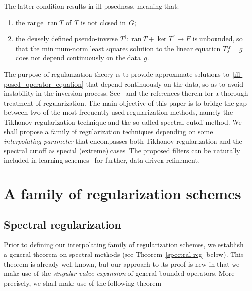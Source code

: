\documentclass[a4paper]{article}
\def\ran#1{\mathop{\mathrm{ran}}#1}
\def\ker#1{\mathop{\mathrm{ker}}#1}
\begin{document}
The latter condition results in ill-posedness, meaning that:
\begin{enumerate}
\item[(i)]
the range $\ran{T}$ of~$T$ is not closed in~$G$;
\item[(ii)]
the densely defined pseudo-inverse $T^\dagger\colon \ran{T}+\ker{T^*}\to F$
is unbounded, so that the minimum-norm least squares solution to the linear
equation $Tf=g$ does not depend continuously on the data~$g$.
\end{enumerate}

The purpose of regularization theory is to provide approximate solutions
to~\eqref{ill-posed_operator_equation} that depend continuously on the
data, so as to avoid instability in the inversion process. See~\cite{arridge} and the references therein for a thorough treatment of regularization. 
The main objective of this paper is to bridge the gap between two
of the most frequently used regularization methods, namely the Tikhonov
regularization technique and the so-called spectral cutoff method. We shall propose
a family of regularization techniques depending on some {\sl interpolating
parameter} that encompasses both Tikhonov regularization and the spectral cutoff
as special (extreme) cases. The proposed filters can be naturally included in learning schemes~\cite{arridge} for further, data-driven refinement.

\section{A family of regularization schemes}

\subsection{Spectral regularization}

Prior to defining our interpolating family of regularization schemes,
we establish a general theorem on spectral methods (see Theorem~\ref{spectral-reg} below).
This theorem is already well-known, but our approach to its proof is new in that we make use of the {\sl singular
value expansion} of general bounded operators. More precisely, we shall make use of the following theorem.
\end{document}
